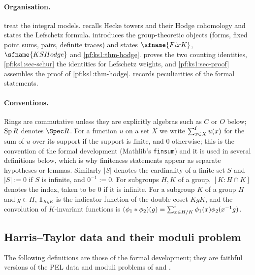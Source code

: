 \paragraph{Organisation.}  treat the integral models.
 recalls Hecke towers and their Hodge cohomology and states the Lefschetz
formula.  introduces the group-theoretic objects (forms, fixed point sums,
pairs, definite traces) and states $\sfname{FixK}$, $\sfname{KSHodge}$ and \cref{pf:ks1:thm-hodge}.
 proves the two counting identities, \cref{pf:ks1:sec-schur} the identities for
Lefschetz weights, and \cref{pf:ks1:sec-proof} assembles the proof of \cref{pf:ks1:thm-hodge}.
 records peculiarities of the formal statements.

\paragraph{Conventions.}
Rings are commutative unless they are explicitly algebras such as $C$ or $O$ below; $\operatorname{Sp} R$ denotes $\Spec R$.
For a function $u$ on a set $X$ we write $\textstyle\sum\nolimits^{\mathrm f}_{x\in X}u(x)$ for the sum of $u$ over its support if
the support is finite, and $0$ otherwise; this is the convention of the formal development (Mathlib's
\texttt{finsum}) and it is used in several definitions below, which is why finiteness statements appear
as separate hypotheses or lemmas. Similarly $|S|$ denotes the cardinality of a finite set $S$ and
$|S|:=0$ if $S$ is infinite, and $0^{-1}:=0$. For subgroups $H,K$ of a group, $[K:H\cap K]$ denotes the index,
taken to be $0$ if it is infinite. For a subgroup $K$ of a group $H$ and
$g\in H$, $\mathbf 1_{KgK}$ is the indicator function of the double coset $KgK$, and the convolution of
$K$-invariant functions is $(\phi_1*\phi_2)(g)=\textstyle\sum\nolimits^{\mathrm f}_{x\in H/K}\phi_1(x)\phi_2(x^{-1}g)$.

\subsection{Harris--Taylor data and their moduli problem}\label{pf:ks1:sec-data}

The following definitions are those of the formal development; they are faithful versions of the
PEL data and moduli problems of \cite[\S5]{Kottwitz1992} and \cite[Ch.~III]{HarrisTaylor2001}.

